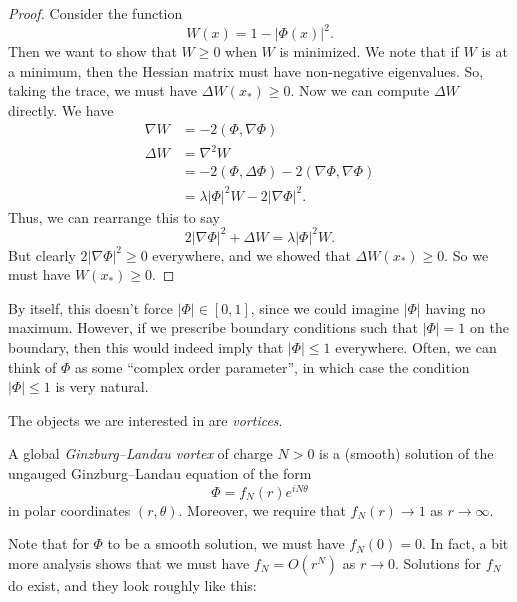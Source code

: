 \documentclass[a4paper]{article}
\begin{document}
\begin{proof}
  Consider the function
  \[
    W(x) = 1 - |\Phi(x)|^2.
  \]
  Then we want to show that $W \geq 0$ when $W$ is minimized. We note that if $W$ is at a minimum, then the Hessian matrix must have non-negative eigenvalues. So, taking the trace, we must have $\Delta W(x_*) \geq 0$. Now we can compute $\Delta W$ directly. We have
  \begin{align*}
    \nabla W &= -2 (\Phi, \nabla \Phi)\\
    \Delta W &= \nabla^2 W \\
    &= - 2(\Phi, \Delta \Phi) - 2(\nabla \Phi, \nabla \Phi)\\
    &= \lambda |\Phi|^2 W - 2 |\nabla \Phi|^2.
  \end{align*}
  Thus, we can rearrange this to say
  \[
    2 |\nabla \Phi|^2 + \Delta W = \lambda |\Phi|^2 W.
  \]
  But clearly $2 |\nabla \Phi|^2 \geq 0$ everywhere, and we showed that $\Delta W(x_*) \geq 0$. So we must have $W(x_*) \geq 0$.
\end{proof}

By itself, this doesn't force $|\Phi| \in [0, 1]$, since we could imagine $|\Phi|$ having no maximum. However, if we prescribe boundary conditions such that $|\Phi| = 1$ on the boundary, then this would indeed imply that $|\Phi| \leq 1$ everywhere. Often, we can think of $\Phi$ as some ``complex order parameter'', in which case the condition $|\Phi| \leq 1$ is very natural.

The objects we are interested in are \emph{vortices}.

\begin{defi}
  A global \emph{Ginzburg--Landau vortex} of charge $N > 0$ is a (smooth) solution of the ungauged Ginzburg--Landau equation of the form
  \[
    \Phi = f_N(r) e^{iN\theta}
  \]
  in polar coordinates $(r, \theta)$. Moreover, we require that $f_N(r) \to 1$ as $r \to \infty$.
\end{defi}
Note that for $\Phi$ to be a smooth solution, we must have $f_N(0) = 0$. In fact, a bit more analysis shows that we must have $f_N = O(r^N)$ as $r \to 0$. Solutions for $f_N$ do exist, and they look roughly like this:

\begin{center}
\end{center}
\end{document}
